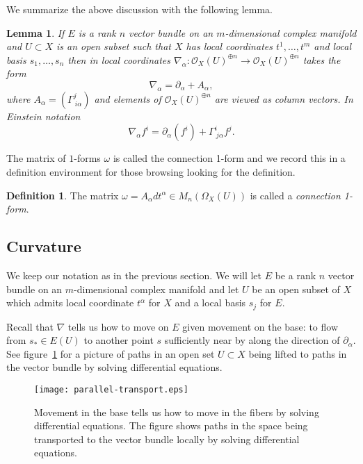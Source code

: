 \documentclass[12pt]{book}
\numberwithin{equation}{section}
\newtheorem{lemma}[theorem]{Lemma}
\theoremstyle{definition}
\newtheorem{definition}[theorem]{Definition}
\theoremstyle{remark}
\newcommand{\Ocal}{\mathcal{O}}
\begin{document}
We summarize the above discussion with the following lemma.
\begin{lemma}
	If $E$ is a rank $n$ vector bundle on an $m$-dimensional complex manifold and $U \subset X$ is an open subset such that $X$ has local coordinates $t^1,\ldots,t^m$ and local basis $s_1,\ldots,s_n$ then in local coordinates  $\nabla_{\alpha}:\Ocal_X(U)^{\oplus n} \to \Ocal_X(U)^{\oplus n}$ takes the form
	$$ \nabla_{\alpha} = \partial_{\alpha} + A_{\alpha},$$
	where $A_{\alpha} = (\Gamma^j_{\ i \alpha})$ and elements of $\Ocal_X(U)^{\oplus n}$ are viewed as column vectors.
	In Einstein notation
	$$ \nabla_{\alpha} f^i = \partial_{\alpha}(f^i) + \Gamma^i_{\ j \alpha}f^j.$$
\end{lemma}

The matrix of $1$-forms $\omega$ is called the connection 1-form and we record this in a definition environment for those browsing looking for the definition.
\begin{definition}
	The matrix $\omega = A_{\alpha}dt^{\alpha} \in M_n(\Omega_X(U))$ is called a \emph{connection 1-form}.
\end{definition}


\subsection{Curvature}
We keep our notation as in the previous section.
We will let $E$ be a rank $n$ vector bundle on an $m$-dimensional complex manifold and let $U$ be an open subset of $X$ which admits local coordinate $t^{\alpha}$ for $X$ and a local basis $s_j$ for $E$.

Recall that $\nabla$ tells us how to move on $E$ given movement on the base: to flow from $s_* \in E(U)$ to another point $s$ sufficiently near by along the direction of $\partial_{\alpha}$. 
See figure~\ref{F:parallel-transport} for a picture of paths in an open set $U\subset X$ being lifted to paths in the vector bundle by solving differential equations.
\begin{figure}[h]\label{F:parallel-transport}
	\begin{center}
		\texttt{[image: parallel-transport.eps]}
	\end{center}
	\caption{Movement in the base tells us how to move in the fibers by solving differential equations. The figure shows paths in the space being transported to the vector bundle locally by solving differential equations.}
\end{figure}
\end{document}
